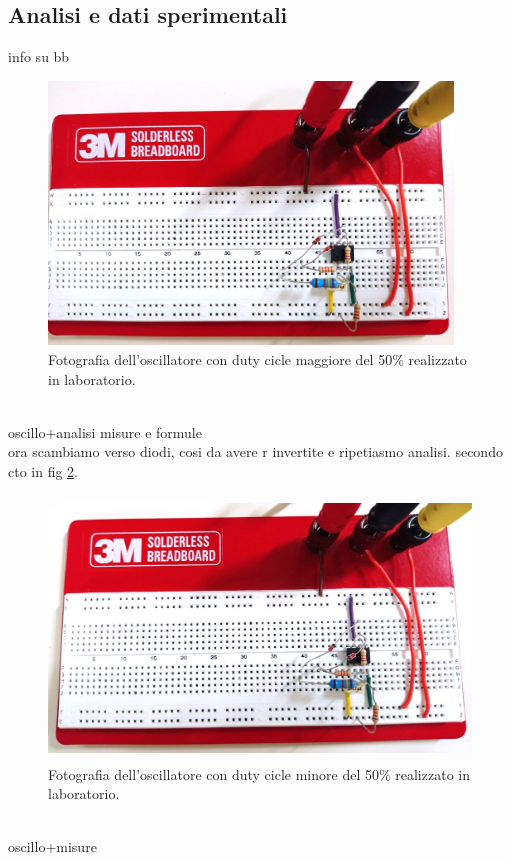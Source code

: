 \documentclass{report}
\begin{document}
\subsection{Analisi e dati sperimentali}
info su bb
\begin{figure}[h!]
	\centering
	\includegraphics[height=7cm]{immagini/circuito4_1.jpg}
	\caption{Fotografia dell'oscillatore con duty cicle maggiore del 50\% realizzato in laboratorio.}
	\label{figura:circuito4_1}
\end{figure}
\\oscillo+analisi misure e formule
\\ora scambiamo verso diodi, cosi da avere r invertite e ripetiasmo analisi. secondo cto in fig \ref{figura:circuito4_2}.
\begin{figure}[h!]
	\centering
	\includegraphics[height=7cm]{immagini/circuito4_2.jpg}
	\caption{Fotografia dell'oscillatore con duty cicle minore del 50\% realizzato in laboratorio.}
	\label{figura:circuito4_2}
\end{figure}
\\oscillo+misure

\end{document}

